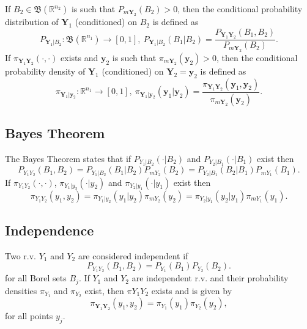 If $B_2\in\mathfrak{B}(\mathbb{R}^{n_2})$ is such that $P_{m\mathbf{Y}_2}(B_2)>0$, then the
conditional probability distribution of $\mathbf{Y}_1$ (conditioned) on $B_2$ is defined as
\begin{equation*}
P_{\mathbf{Y}_1|B_2}:\mathfrak{B}(\mathbb{R}^{n_1})\rightarrow [0,1],~
P_{\mathbf{Y}_1|B_2}(B_1|B_2)
=
\frac
{P_{\mathbf{Y}_1\mathbf{Y}_2}(B_1,B_2)}
{P_{m\mathbf{Y}_2}(B_2)}.
\end{equation*}
%
If $\pi_{\mathbf{Y}_1\mathbf{Y}_2}(\cdot,\cdot)$ exists and $\mathbf{y}_2$ is such that $\pi_{m\mathbf{Y}_2}(\mathbf{y}_2)>0$, then the
conditional probability density of $\mathbf{Y}_1$ (conditioned) on $\mathbf{Y}_2=\mathbf{y}_2$ is defined as
\begin{equation*}
\pi_{\mathbf{Y}_1|\mathbf{y}_2}:\mathbb{R}^{n_1}\rightarrow [0,1],~
\pi_{\mathbf{Y}_1|\mathbf{y}_2}(\mathbf{y}_1|\mathbf{y}_2)
=
\frac
{\pi_{\mathbf{Y}_1\mathbf{Y}_2}(\mathbf{y}_1,\mathbf{y}_2)}
{\pi_{m\mathbf{Y}_2}(\mathbf{y}_2)}.
\end{equation*}

\subsection{Bayes Theorem}

The Bayes Theorem \cite{KaSo05} states that
if $P_{Y_1|B_2}(\cdot|B_2)$ and $P_{Y_2|B_1}(\cdot|B_1)$ exist then
\begin{equation}\label{eq-Bayes-1}
P_{Y_1Y_2}(B_1,B_2) = P_{Y_1|B_2}(B_1|B_2)P_{mY_2}(B_2) = P_{Y_2|B_1}(B_2|B_1)P_{mY_1}(B_1).
\end{equation}
If $\pi_{Y_1Y_2}(\cdot,\cdot)$, $\pi_{Y_1|y_2}(\cdot|y_2)$ and $\pi_{Y_2|y_1}(\cdot|y_1)$ exist then
\begin{equation}\label{eq-Bayes-2}
\pi_{Y_1Y_2}(y_1,y_2) = \pi_{Y_1|y_2}(y_1|y_2)\pi_{mY_2}(y_2) = \pi_{Y_2|y_1}(y_2|y_1)\pi_{mY_1}(y_1).
\end{equation}

\subsection{Independence}

Two r.v. $Y_1$ and $Y_2$ are considered independent if
\begin{equation*}
P_{Y_1Y_2}(B_1,B_2) = P_{Y_1}(B_1)P_{Y_2}(B_2).
\end{equation*}
for all Borel sets $B_j$.
If $Y_1$ and $Y_2$ are independent r.v. and
their probability densities $\pi_{Y_1}$ and $\pi_{Y_2}$ exist,
then $\pi{Y_1Y_2}$ exists and is given by
\begin{equation*}
\pi_{\mathbf{Y}_1\mathbf{Y}_2}(y_1,y_2) = \pi_{Y_1}(y_1)\pi_{Y_2}(y_2),
\end{equation*}
for all points $y_j$.

